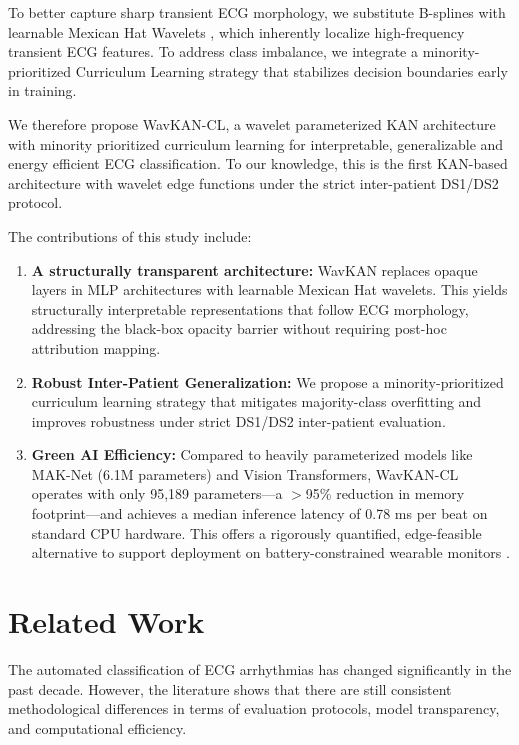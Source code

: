 \documentclass[final,5p,times,twocolumn,number]{elsarticle}
\begin{document}
To better capture sharp transient ECG morphology, we substitute B-splines with learnable Mexican Hat Wavelets \cite{addison_wavelet_2005, bozorgasl_liu_2024}, which inherently localize high-frequency transient ECG features. To address class imbalance, we integrate a minority-prioritized Curriculum Learning strategy \cite{bengio_curriculum_2009, schmale_curriculum_2025} that stabilizes decision boundaries early in training.

We therefore propose WavKAN-CL, a wavelet parameterized KAN architecture with minority prioritized curriculum learning for interpretable, generalizable and energy efficient ECG classification. To our knowledge, this is the first KAN-based architecture with wavelet edge functions under the strict inter-patient DS1/DS2 protocol.

The contributions of this study include:
\begin{enumerate}
    \item \textbf{A structurally transparent architecture:} WavKAN replaces opaque layers in MLP architectures with learnable Mexican Hat wavelets. This yields structurally interpretable representations that follow ECG morphology, addressing the black-box opacity barrier without requiring post-hoc attribution mapping.
    \item \textbf{Robust Inter-Patient Generalization:} We propose a minority-prioritized curriculum learning strategy that mitigates majority-class overfitting and improves robustness under strict DS1/DS2 inter-patient evaluation. 
    \item \textbf{Green AI Efficiency:} Compared to heavily parameterized models like MAK-Net (6.1M parameters) and Vision Transformers, WavKAN-CL operates with only 95,189 parameters---a $>$95\% reduction in memory footprint---and achieves a median inference latency of 0.78 ms per beat on standard CPU hardware. This offers a rigorously quantified, edge-feasible alternative to support deployment on battery-constrained wearable monitors \cite{farag_tiny_2023, elsheikhy_lightweight_2025}.
\end{enumerate}

\section{Related Work}
\label{sec:related_work}

The automated classification of ECG arrhythmias has changed significantly in the past decade. However, the literature shows that there are still consistent methodological differences in terms of evaluation protocols, model transparency, and computational efficiency.
\end{document}
